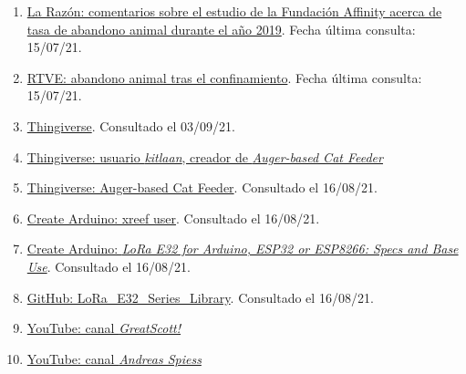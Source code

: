 \documentclass[12pt]{article}
\begin{document}
\begin{enumerate}
			\item
			\label{bib: enlace La Razón} \href{https://www.larazon.es/medio-ambiente/20201118/qxv6yuokargfbnjvknn6bhm4ze.html}{La Razón: comentarios sobre el estudio de la Fundación Affinity acerca de tasa de abandono animal durante el año 2019}. Fecha última consulta: 15/07/21.
			
			\item
			\label{bib: enlace RTVE} \href{https://www.rtve.es/noticias/20200608/abandonos-animales-domesticos-se-han-disparado-espana-durante-meses-confinamiento/2015761.shtml}{RTVE: abandono animal tras el confinamiento}. Fecha última consulta: 15/07/21.
			
			\item
			\label{bib: thingiverse web}
			\href{https://www.thingiverse.com/}{Thingiverse}. Consultado el 03/09/21.
			
			\item
			\label{bib: thingiverse kitlaan}
			\href{https://www.thingiverse.com/kitlaan/designs}{Thingiverse: usuario \textit{kitlaan}, creador de \textit{Auger-based Cat Feeder}}
			
			\item 
			\label{bib: thingiverse helices comedero}
			\href{https://www.thingiverse.com/thing:27854}{Thingiverse: Auger-based Cat Feeder}. Consultado el 16/08/21.
			
			\item 
			\label{bib: xreef user}
			\href{https://create.arduino.cc/projecthub/xreef}{Create Arduino: xreef user}. Consultado el 16/08/21.	
			
			\item 
			\label{bib: xreef project}
			\href{https://create.arduino.cc/projecthub/xreef/lora-e32-for-arduino-esp32-or-esp8266-specs-and-base-use-804d25}{Create Arduino: \textit{LoRa E32 for Arduino, ESP32 or ESP8266: Specs and Base Use}}. Consultado el 16/08/21.	
			
			\item 
			\label{bib: xreef library}
			\href{https://github.com/xreef/LoRa_E32_Series_Library}{GitHub: LoRa\_E32\_Series\_Library}. Consultado el 16/08/21.
			
			\item
			\label{bib: canal greatScott}
			\href{https://www.youtube.com/channel/UC6mIxFTvXkWQVEHPsEdflzQ}{YouTube: canal \textit{GreatScott!}}
			
			\item
			\label{bib: canal andreas}
			\href{https://www.youtube.com/channel/UCu7_D0o48KbfhpEohoP7YSQ}{YouTube: canal \textit{Andreas Spiess}}
			

\end{enumerate}
\end{document}
